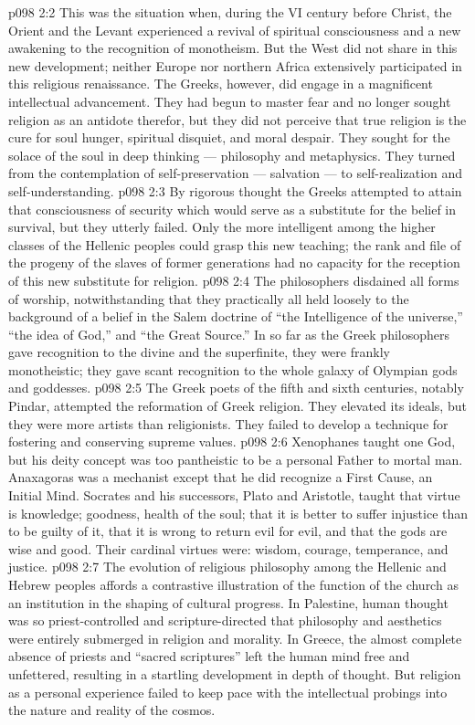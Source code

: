 \vs p098 2:2 This was the situation when, during the VI century before Christ, the Orient and the Levant experienced a revival of spiritual consciousness and a new awakening to the recognition of monotheism. But the West did not share in this new development; neither Europe nor northern Africa extensively participated in this religious renaissance. The Greeks, however, did engage in a magnificent intellectual advancement. They had begun to master fear and no longer sought religion as an antidote therefor, but they did not perceive that true religion is the cure for soul hunger, spiritual disquiet, and moral despair. They sought for the solace of the soul in deep thinking --- philosophy and metaphysics. They turned from the contemplation of self\hyp{}preservation --- salvation --- to self\hyp{}realization and self\hyp{}understanding.
\vs p098 2:3 By rigorous thought the Greeks attempted to attain that consciousness of security which would serve as a substitute for the belief in survival, but they utterly failed. Only the more intelligent among the higher classes of the Hellenic peoples could grasp this new teaching; the rank and file of the progeny of the slaves of former generations had no capacity for the reception of this new substitute for religion.
\vs p098 2:4 \pc The philosophers disdained all forms of worship, notwithstanding that they practically all held loosely to the background of a belief in the Salem doctrine of “the Intelligence of the universe,” “the idea of God,” and “the Great Source.” In so far as the Greek philosophers gave recognition to the divine and the superfinite, they were frankly monotheistic; they gave scant recognition to the whole galaxy of Olympian gods and goddesses.
\vs p098 2:5 The Greek poets of the fifth and sixth centuries, notably Pindar, attempted the reformation of Greek religion. They elevated its ideals, but they were more artists than religionists. They failed to develop a technique for fostering and conserving supreme values.
\vs p098 2:6 Xenophanes taught one God, but his deity concept was too pantheistic to be a personal Father to mortal man. Anaxagoras was a mechanist except that he did recognize a First Cause, an Initial Mind. Socrates and his successors, Plato and Aristotle, taught that virtue is knowledge; goodness, health of the soul; that it is better to suffer injustice than to be guilty of it, that it is wrong to return evil for evil, and that the gods are wise and good. Their cardinal virtues were: wisdom, courage, temperance, and justice.
\vs p098 2:7 \pc The evolution of religious philosophy among the Hellenic and Hebrew peoples affords a contrastive illustration of the function of the church as an institution in the shaping of cultural progress. In Palestine, human thought was so priest\hyp{}controlled and scripture\hyp{}directed that philosophy and aesthetics were entirely submerged in religion and morality. In Greece, the almost complete absence of priests and “sacred scriptures” left the human mind free and unfettered, resulting in a startling development in depth of thought. But religion as a personal experience failed to keep pace with the intellectual probings into the nature and reality of the cosmos.
